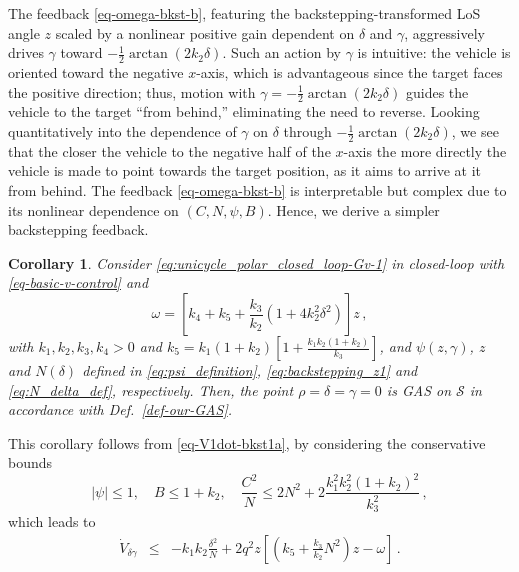 \documentclass[journal,twoside,web]{ieeecolor}
\newtheorem{corollary}{Corollary}
\theoremstyle{definition}
\begin{document}
The feedback \eqref{eq-omega-bkst-b}, featuring the backstepping-transformed LoS angle $z$ scaled by a nonlinear positive gain dependent on $\delta$ and $\gamma$, aggressively drives $\gamma$ toward $-\tfrac{1}{2}\arctan(2k_2\delta)$.
 Such an action by $\gamma$ is intuitive: 
 the vehicle is oriented toward the negative $x$-axis, which is advantageous since the target faces the positive direction; thus, motion with $\gamma = -\tfrac{1}{2}\arctan(2k_2\delta)$ guides the vehicle to the target “from behind,” eliminating the need to reverse. Looking quantitatively into the dependence of $\gamma$ on $\delta$ through $-\frac{1}{2}\arctan(2 k_2 \delta)$, we see that the closer the vehicle to the negative half of the $x$-axis the more directly the vehicle is made to point towards the target position, as it aims to arrive at it from behind. 
The feedback \eqref{eq-omega-bkst-b} is interpretable but complex due to its nonlinear dependence on $(C,N,\psi,B)$. Hence, we derive a simpler backstepping feedback. 
\begin{corollary}
\textit Consider
\eqref{eq:unicycle_polar_closed_loop-Gv-1} in closed-loop with \eqref{eq-basic-v-control} and 
\begin{equation}
\label{eq-omega-bkst-c}
\displaystyle \omega = \left[ k_4 + k_5 +\frac{k_3}{k_2}\left(1+4k_2^2\delta^2\right) \right] z \,,
\end{equation}
with $k_1, k_2, k_3, k_4 > 0$ and $k_5 = k_1 (1+k_2) \left[1+ \frac{k_1k_2(1+k_2)}{k_3}\right]$, and $\psi(z,\gamma)$, $z$ and $N(\delta)$ defined in \eqref{eq:psi_definition}, \eqref{eq:backstepping_z1} and \eqref{eq:N_delta_def}, respectively.  Then, the point $\rho = \delta = \gamma = 0$ is GAS on $\mathcal{S}$ in accordance with Def.~\ref{def-our-GAS}.
\end{corollary}
This corollary follows from \eqref{eq-V1dot-bkst1a}, by considering the conservative bounds
\begin{equation*}
|\psi| \leq  1,
\quad B \leq  1+ k_2,
\quad \frac{C^2}{N} \leq  2N^2 + 2 \frac{k_1^2 k_2^2 (1+k_2)^2}{k_3^2}\,,
\end{equation*}
which leads to
\begin{align}
\label{eq-V1dot-bkst1c}
\dot V_{\delta \gamma}
&\leq & -  k_1 k_2 \frac{\delta^2}{N}+ 2 q^2 z \left[\left( k_5 +\frac{k_3}{k_2}N^2\right) z - \omega
\right]
\,. 
\end{align}
\end{document}
